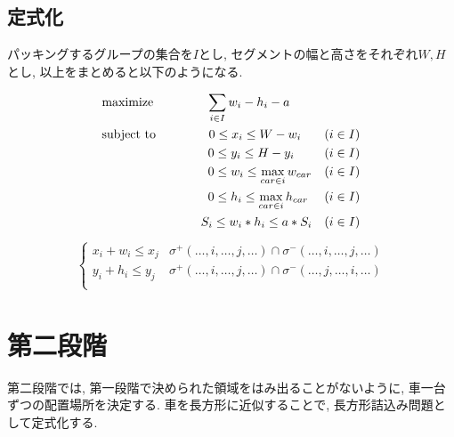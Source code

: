 \subsection{定式化}
パッキングするグループの集合を$I$とし, セグメントの幅と高さをそれぞれ$W, H$とし, 以上をまとめると以下のようになる. \\
\begin{center}
    \begin{align}
        & \textrm{maximize} \hspace{1.5cm}
        \sum_{i \in I} w_i - h_i - a \\
        & \textrm{subject\ to} \hspace{1.5cm}
        0 \leq x_i \leq W - w_i & (i \in I) \\
        &\hspace{3cm} 0 \leq y_i \leq H - y_i & (i \in I) \\
        &\hspace{3cm} 0 \leq w_i \leq \max_{car \in i}w_{car} & (i \in I) \\
        &\hspace{3cm} 0 \leq h_i \leq \max_{car \in i}h_{car} & (i \in I) \\
        &\hspace{2.8cm} S_i \leq w_i*h_i \leq a*S_i &(i \in I)
    \end{align}
    \begin{eqnarray}
        \hspace{2cm} \left\{
            \begin{array}{ll}
                x_i + w_i \leq x_j & \sigma^+(\ldots,i,\ldots,j,\ldots) \cap \sigma^-(\ldots,i,\ldots,j,\ldots) \\
                y_i + h_i \leq y_j & \sigma^+(\ldots,i,\ldots,j,\ldots) \cap \sigma^-(\ldots,j,\ldots,i,\ldots) \\
            \end{array}
        \hspace{2cm} \right.
    \end{eqnarray}
\end{center}

\section{第二段階}
第二段階では, 第一段階で決められた領域をはみ出ることがないように, 車一台ずつの配置場所を決定する. 
車を長方形に近似することで, 長方形詰込み問題として定式化する. 

